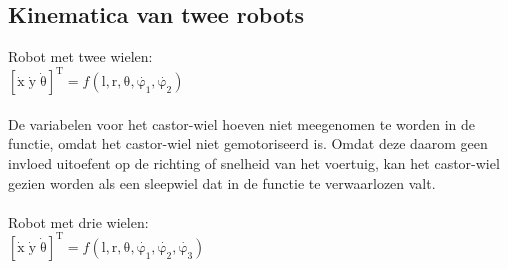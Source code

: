 \documentclass[a4paper]{article}
\begin{document}
\subsection{Kinematica van twee robots}
Robot met twee wielen:\\
$\mathrm{[\dot{x}\; \dot{y}\; \dot{\theta}]^T} = f\mathrm{(l, r, \theta, \dot{\varphi_{1}}, \dot{\varphi_{2}})}$\\
\\
De variabelen voor het castor-wiel hoeven niet meegenomen te worden in de functie, omdat het castor-wiel niet gemotoriseerd is. Omdat deze daarom geen invloed uitoefent op de richting of snelheid van het voertuig, kan het castor-wiel gezien worden als een sleepwiel dat in de functie te verwaarlozen valt.\\\\
Robot met drie wielen:\\
$\mathrm{[\dot{x}\; \dot{y}\; \dot{\theta}]^T} = f\mathrm{(l, r, \theta, \dot{\varphi_{1}}, \dot{\varphi_{2}}, \dot{\varphi_{3}})}$\\
\end{document}
